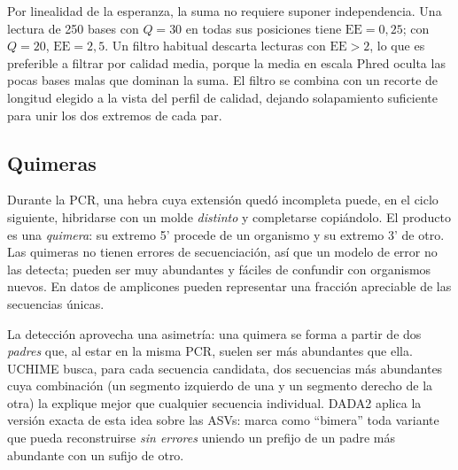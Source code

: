 \begin{simbolos}
\end{simbolos}

Por linealidad de la esperanza, la suma no requiere suponer independencia. Una lectura de 250 bases con $Q=30$ en todas sus posiciones tiene $\mathrm{EE}=0{,}25$; con $Q=20$, $\mathrm{EE}=2{,}5$. Un filtro habitual descarta lecturas con $\mathrm{EE}>2$, lo que es preferible a filtrar por calidad media, porque la media en escala Phred oculta las pocas bases malas que dominan la suma. El filtro se combina con un recorte de longitud elegido a la vista del perfil de calidad, dejando solapamiento suficiente para unir los dos extremos de cada par.

\subsection{Quimeras}

Durante la PCR, una hebra cuya extensión quedó incompleta puede, en el ciclo siguiente, hibridarse con un molde \emph{distinto} y completarse copiándolo. El producto es una \emph{quimera}: su extremo 5' procede de un organismo y su extremo 3' de otro. Las quimeras no tienen errores de secuenciación, así que un modelo de error no las detecta; pueden ser muy abundantes y fáciles de confundir con organismos nuevos. En datos de amplicones pueden representar una fracción apreciable de las secuencias únicas.

La detección aprovecha una asimetría: una quimera se forma a partir de dos \emph{padres} que, al estar en la misma PCR, suelen ser más abundantes que ella. UCHIME \parencite{c14-edgar2011} busca, para cada secuencia candidata, dos secuencias más abundantes cuya combinación (un segmento izquierdo de una y un segmento derecho de la otra) la explique mejor que cualquier secuencia individual. DADA2 aplica la versión exacta de esta idea sobre las ASVs: marca como ``bimera'' toda variante que pueda reconstruirse \emph{sin errores} uniendo un prefijo de un padre más abundante con un sufijo de otro.

